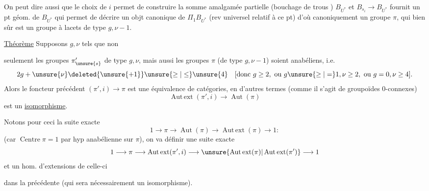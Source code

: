 On peut dire aussi que le choix de \(i\) permet de construire la somme amalgamée partielle (bouchage de trous ) \(B_{U^*}\)
et \(B_{s_i}\longrightarrow B_{U^*}\) fournit un pt géom. de \(B_{U^*}\) qui permet de décrire un objt canonique de \(\Pi_1B_{U^*}\) (rev universel relatif à ce pt) d'où canoniquement un groupe \(\pi\), qui bien sûr est un groupe à lacets de type \(g,\nu-1\).

\uline{Théorème} Supposons \(g,\nu\) tels que non


seulement les groupes \(\pi'_{\unsure{s}}\) de type \(g,\nu\), mais aussi les groupes \(\pi\) (de type \(g,\nu-1\)) soient anabéliens, i.e.
\[
2g+\unsure{\nu}\deleted{\unsure{+1}}\unsure{\ge|\le}\unsure{4}
\quad
[\text{donc }g\ge2,\ \text{ou }g\unsure{\ge|=}1,\nu\ge2,\ \text{ou }g=0,\nu\ge4].
\]
Alors le foncteur précédent \((\pi',i)\longrightarrow\pi\) est une équivalence de catégories, en d'autres termes (comme il s'agit de groupoïdes \(0\)-connexes)
\[
\operatorname{Aut\,ext}(\pi',i)\longrightarrow\operatorname{Aut}(\pi)
\]
est un \uline{isomorphisme}.

Notons pour ceci  la suite exacte
\[
1\longrightarrow\pi\longrightarrow\operatorname{Aut}(\pi)
\longrightarrow\operatorname{Aut\,ext}(\pi)\longrightarrow1:
\]
(car \(\operatorname{Centre}\pi=1\) par hyp anabélienne sur \(\pi\)),  on va définir une suite exacte
\[
1\longrightarrow\pi\longrightarrow\operatorname{Aut\,ext}(\pi',i)
\longrightarrow\unsure{\operatorname{Aut\,ext}(\pi)|\operatorname{Aut\,ext}(\pi')}
\longrightarrow1
\]
et un hom. d'extensions de celle-ci


dans la précédente (qui sera nécessairement un isomorphisme).

